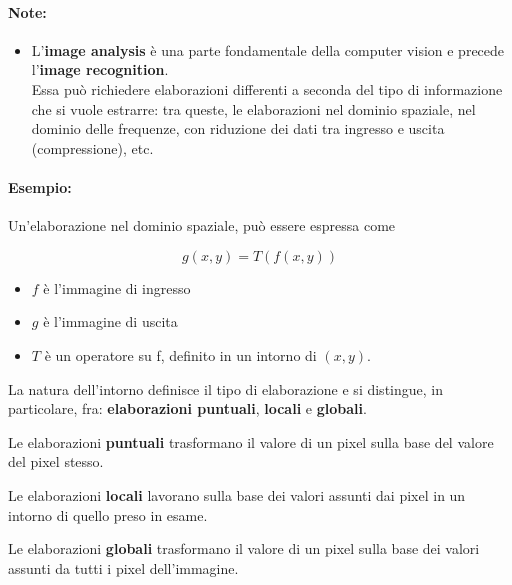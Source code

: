 \paragraph{Note:}

\begin{itemize}
    \item L'\textbf{image analysis} è una parte fondamentale della computer
          vision e precede l'\textbf{image recognition}.\\
          Essa può richiedere elaborazioni differenti a seconda del tipo di
          informazione che si vuole estrarre: tra queste, le elaborazioni nel
          dominio spaziale, nel dominio delle frequenze, con riduzione dei dati
          tra ingresso e uscita (compressione), etc.
\end{itemize}

\paragraph{Esempio:}

Un'elaborazione nel dominio spaziale, può essere espressa come

$$
    g(x , y) = T(f (x , y))
$$

\begin{itemize}
    \item $f$ è l'immagine di ingresso
    \item $g$ è l'immagine di uscita
    \item $T$ è un operatore su f, definito in un intorno di $(x , y)$.
\end{itemize}

La natura dell'intorno definisce il tipo di elaborazione e si distingue, in
particolare, fra: \textbf{elaborazioni puntuali}, \textbf{locali} e
\textbf{globali}.

\begin{definition}
    Le elaborazioni \textbf{puntuali} trasformano il valore di un pixel sulla
    base del valore del pixel stesso.
\end{definition}

\begin{definition}
    Le elaborazioni \textbf{locali} lavorano sulla base dei valori assunti dai
    pixel in un intorno di quello preso in esame.
\end{definition}

\begin{definition}
    Le elaborazioni \textbf{globali} trasformano il valore di un pixel sulla
    base dei valori assunti da tutti i pixel dell'immagine.
\end{definition}

